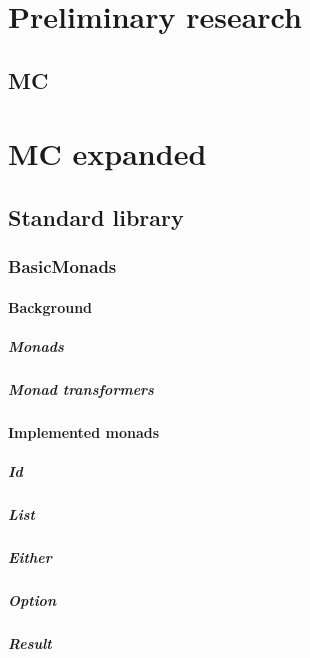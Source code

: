 \part{Preliminary research}
\chapter{MC}


\part{MC expanded}

\chapter{Standard library}
\section{BasicMonads}
\subsection{Background}
\subsubsection{Monads}
\subsubsection{Monad transformers}
\subsection{Implemented monads}
\subsubsection{Id}
\subsubsection{List}
\subsubsection{Either}
\subsubsection{Option}
\subsubsection{Result}
